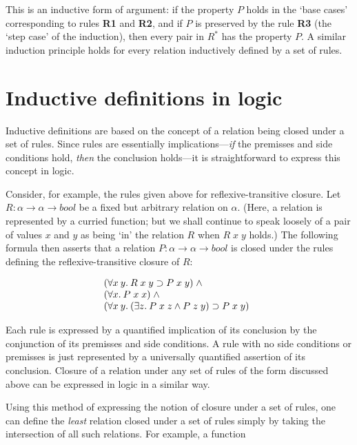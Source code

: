 \documentclass[twocolumn,fleqn,layout]{article}
\begin{document}
\noindent This is an inductive form of argument: if the property $P$ holds in
the `base cases' corresponding to rules {{\small\bf R}\bf 1} and {{\small\bf
R}\bf 2}, and if $P$ is preserved by the rule {{\small\bf R}\bf 3} (the `step
case' of the induction), then every pair in $R^{*}$ has the property $P$.  A
similar induction principle holds for every relation inductively defined by a
set of rules.

\section{Inductive definitions in logic}\label{in-logic}


Inductive definitions are based on the concept of a relation being closed under
a set of rules.  Since rules are essentially implications---{\it if\/} the
premisses and side conditions hold, {\it then\/} the conclusion holds---it is
straightforward to express this concept in logic.

Consider, for example, the rules given above for reflexive-transitive closure.
Let $R : \alpha{\rightarrow}\alpha{\rightarrow}bool$ be a fixed but arbitrary
 relation on $\alpha$. (Here, a relation is represented by a curried function;
but we shall continue to speak loosely of a pair of values $x$ and $y$ as being
`in' the relation $R$ when $R\;x\;y$ holds.)  The following formula then
asserts that a relation $P : \alpha{\rightarrow}\alpha{\rightarrow}bool$ is
closed under the rules defining the reflexive-transitive closure of $R$:

\smallskip
\[\begin{array}[t]{@{}l}
 (\forall x\:y.\:R\;x\;y \supset P\;x\;y)\; \wedge \\
 (\forall x.\:P\;x\;x)\; \wedge \\
 (\forall x\:y.\:(\exists z.\:P\;x\;z \wedge P\;z\;y) \supset P\;x\;y)
\end{array}\]
\smallskip

\noindent Each rule is expressed by a quantified implication of its conclusion
by the conjunction of its premisses and side conditions.  A rule with no side
conditions or premisses is just represented by a universally quantified
assertion of its conclusion. Closure of a relation under any set of rules of
the form discussed above can be expressed in logic in a similar way.

Using this method of expressing the notion of \mbox{closure} under a set of
rules, one can define the {\it least\/} relation closed under a set of rules
simply by taking the intersection of all such relations.  For example, a
function
\end{document}
